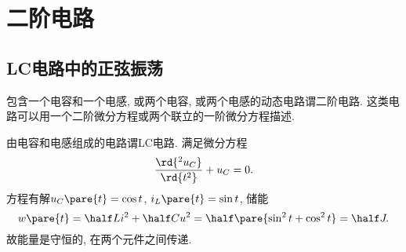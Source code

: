 \documentclass{ctexart}
\begin{document}
\section{二阶电路} %
\label{sec:二阶电路}

\subsection{LC电路中的正弦振荡} %
\label{sub:lc电路中的正弦振荡}

包含一个电容和一个电感, 或两个电容, 或两个电感的动态电路谓二阶电路. 这类电路可以用一个二阶微分方程或两个联立的一阶微分方程描述.
\par
由电容和电感组成的电路谓LC电路. 满足微分方程
\[ \frac{\rd{^2 u_C}}{\rd{t^2}} + u_C = 0. \]
方程有解$u_C\pare{t} = \cos{t}$, $i_L\pare{t} = \sin t$, 储能
\[ w\pare{t} = \half Li^2 + \half Cu^2 = \half \pare{\sin^2 t + \cos^2 t} = \half J. \]
故能量是守恒的, 在两个元件之间传递.

\end{document}
